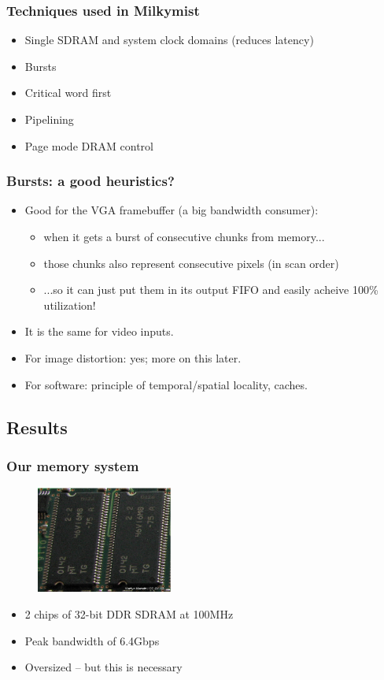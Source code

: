 \documentclass{beamer}
\begin{document}
\frame
{
  \frametitle{Techniques used in Milkymist}
  \begin{itemize}
  \item Single SDRAM and system clock domains (reduces latency)
  \item Bursts
  \item Critical word first
  \item Pipelining
  \item Page mode DRAM control
  \end{itemize}
}

\frame
{
  \frametitle{Bursts: a good heuristics?}

  \begin{itemize}
  \item Good for the VGA framebuffer (a big bandwidth consumer):
  \begin{itemize}
  \item when it gets a burst of consecutive chunks from memory...
  \item those chunks also represent consecutive pixels (in scan order)
  \item ...so it can just put them in its output FIFO and easily acheive 100\% utilization!
  \end{itemize}
  \item It is the same for video inputs.
  \item For image distortion: yes; more on this later.
  \item For software: principle of temporal/spatial locality, caches.
  \end{itemize}
}

\subsection{Results}
\frame
{
  \frametitle{Our memory system}

  \begin{figure}[H]
  \includegraphics[height=35mm]{ddr64.eps}
  \end{figure}

  \begin{itemize}
  \item 2 chips of 32-bit DDR SDRAM at 100MHz
  \item Peak bandwidth of 6.4Gbps
  \item Oversized -- but this is necessary
  \end{itemize}
}
\end{document}
